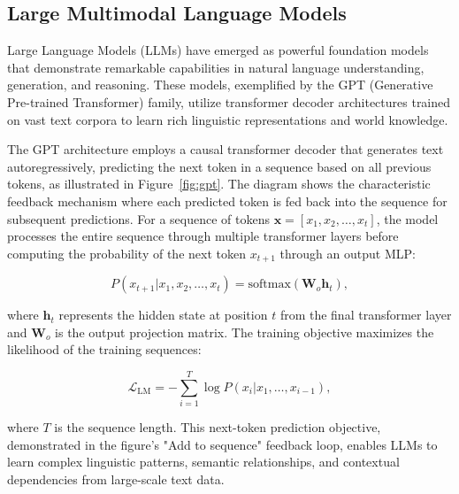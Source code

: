 \subsection{Large Multimodal Language Models}

Large Language Models (LLMs) have emerged as powerful foundation models that demonstrate remarkable capabilities in natural language understanding, generation, and reasoning. These models, exemplified by the GPT (Generative Pre-trained Transformer) family, utilize transformer decoder architectures trained on vast text corpora to learn rich linguistic representations and world knowledge.

The GPT architecture employs a causal transformer decoder that generates text autoregressively, predicting the next token in a sequence based on all previous tokens, as illustrated in Figure~\ref{fig:gpt}. The diagram shows the characteristic feedback mechanism where each predicted token is fed back into the sequence for subsequent predictions. For a sequence of tokens $\mathbf{x} = [x_1, x_2, \ldots, x_t]$, the model processes the entire sequence through multiple transformer layers before computing the probability of the next token $x_{t+1}$ through an output MLP:

\begin{equation}
P(x_{t+1} | x_1, x_2, \ldots, x_t) = \text{softmax}(\mathbf{W}_o \mathbf{h}_t),
\end{equation}

where $\mathbf{h}_t$ represents the hidden state at position $t$ from the final transformer layer and $\mathbf{W}_o$ is the output projection matrix. The training objective maximizes the likelihood of the training sequences:

\begin{equation}
\mathcal{L}_{\text{LM}} = -\sum_{i=1}^{T} \log P(x_i | x_1, \ldots, x_{i-1}),
\end{equation}

where $T$ is the sequence length. This next-token prediction objective, demonstrated in the figure's "Add to sequence" feedback loop, enables LLMs to learn complex linguistic patterns, semantic relationships, and contextual dependencies from large-scale text data.

